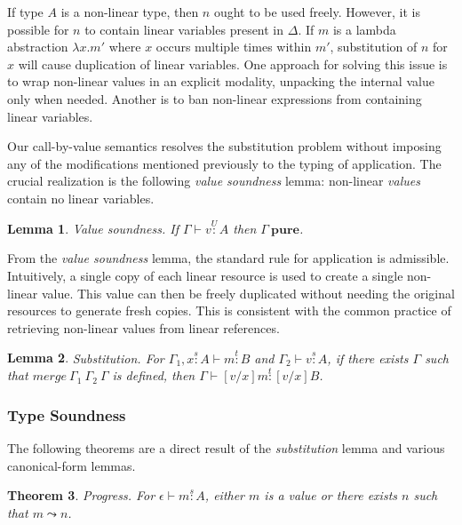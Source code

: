 \documentclass{article}
\newtheorem{theorem}{Theorem}[section]
\newtheorem{lemma}[theorem]{Lemma}
\newcommand{\pure}{\textbf{pure}}
\newcommand{\utype}{\overset{U}{:}}
\newcommand{\stype}[1]{\overset{#1}{:}}
\newcommand{\step}{\leadsto}
\begin{document}
  If type $A$ is a non-linear type, then $n$ ought to be used freely. However, it is possible for $n$ to contain linear variables present in $\Delta$. If $m$ is a lambda abstraction $\lambda x.m'$ where $x$ occurs multiple times within $m'$, substitution of $n$ for $x$ will cause duplication of linear variables. One approach for solving this issue is to wrap non-linear values in an explicit modality, unpacking the internal value only when needed\cite{substitute,neel15}. Another is to ban non-linear expressions from containing linear variables\cite{llf,luo,qtt}.

  Our call-by-value semantics resolves the substitution problem without imposing any of the modifications mentioned previously to the typing of application. The crucial realization is the following \textit{value soundness} lemma: non-linear \textit{values} contain no linear variables.

  \begin{lemma}
    Value soundness. If $\Gamma \vdash v \utype A$ then $\Gamma\ \pure$.
  \end{lemma}

  From the \textit{value soundness} lemma, the standard rule for application is admissible. Intuitively, a single copy of each linear resource is used to create a single non-linear value. This value can then be freely duplicated without needing the original resources to generate fresh copies. This is consistent with the common practice of retrieving non-linear values from linear references.

  \begin{lemma}
    Substitution. For $\Gamma_1, x \stype{s} A \vdash m \stype{t} B$ and $\Gamma_2 \vdash v \stype{s} A$, if there exists $\Gamma$ such that $merge\ \Gamma_1\ \Gamma_2\ \Gamma$ is defined, then $\Gamma \vdash [v/x]m \stype{t} [v/x]B$.
  \end{lemma}

  \subsubsection{Type Soundness}
  The following theorems are a direct result of the \textit{substitution} lemma and various canonical-form lemmas. 

  \begin{theorem}
    Progress. For $\epsilon \vdash m \stype{s} A$, either $m$ is a value or there exists $n$ such that $m \step n$.
  \end{theorem}
\end{document}

